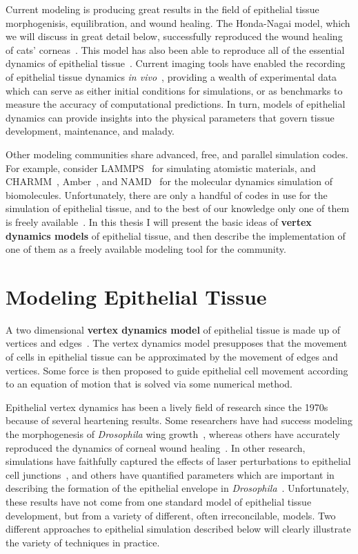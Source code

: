 Current modeling is producing great results in the field of epithelial tissue morphogenisis, equilibration, and wound healing. The Honda-Nagai model, which we will discuss in great detail below, successfully reproduced the wound healing of cats' corneas~\cite{WoundHealing}. This model has also been able to reproduce all of the essential dynamics of epithelial tissue~\cite{HondaNagai}.  Current imaging tools have enabled the recording of epithelial tissue dynamics \emph{in vivo}~\cite{Sokolow, Xiong}, providing a wealth of experimental data which can serve as either initial conditions for simulations, or as benchmarks to measure the accuracy of computational predictions. In turn, models of epithelial dynamics can provide insights into the physical parameters that govern tissue development, maintenance, and malady.

Other modeling communities share advanced, free, and parallel simulation codes. For example, consider LAMMPS~\cite{LAMMPS} for simulating atomistic materials, and CHARMM~\cite{CHARMM}, Amber~\cite{Amber}, and NAMD~\cite{NAMD} for the molecular dynamics simulation of biomolecules. Unfortunately, there are only a handful of codes in use for the simulation of epithelial tissue, and to the best of our knowledge only one of them is freely available~\cite{ChasteMain}. In this thesis I will present the basic ideas of \textbf{vertex dynamics models} of epithelial tissue, and then describe the implementation of one of them as a freely available modeling tool for the community.

\section{Modeling Epithelial Tissue} 
\label{sec:modeling}

A two dimensional \textbf{vertex dynamics model} of epithelial tissue is made up of vertices and edges~\cite{DirichletDomains}. The vertex dynamics model presupposes that the movement of cells in epithelial tissue can be approximated by the movement of edges and vertices. Some force is then proposed to guide epithelial cell movement according to an equation of motion that is solved via some numerical method.

Epithelial vertex dynamics has been a lively field of research since the 1970s because of several heartening results. Some researchers have had success modeling the morphogenesis of \emph{Drosophila} wing growth~\cite{Farhadifar}, whereas others have accurately reproduced the dynamics of corneal wound healing~\cite{WoundHealing}. In other research, simulations have faithfully captured the effects of laser perturbations to epithelial cell junctions~\cite{Yoshi}, and others have quantified parameters which are important in describing the formation of the epithelial envelope in \emph{Drosophila}~\cite{Sokolow}. Unfortunately, these results have not come from one standard model of epithelial tissue development, but from a variety of different, often irreconcilable, models. Two different approaches to epithelial simulation described below will clearly illustrate the variety of techniques in practice.

